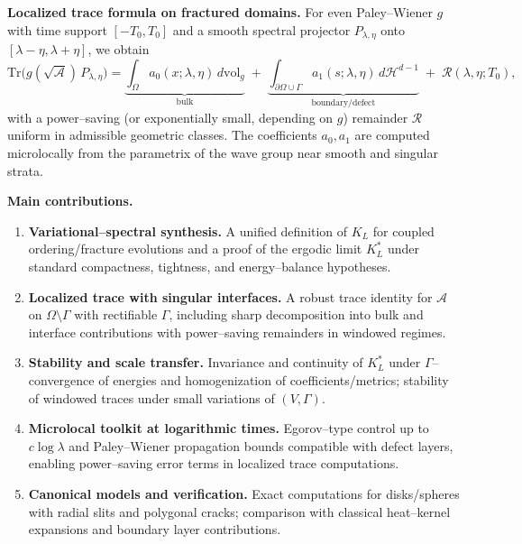 \medskip
\textbf{Localized trace formula on fractured domains.}
For even Paley–Wiener $g$ with time support $[-T_0,T_0]$ and a smooth spectral projector $P_{\lambda,\eta}$ onto $[\lambda-\eta,\lambda+\eta]$, we obtain
\[
\mathrm{Tr}\big(g(\sqrt{\mathcal{A}})\,P_{\lambda,\eta}\big)
=
\underbrace{\int_\Omega a_0(x;\lambda,\eta)\,d\mathrm{vol}_g}_{\text{bulk}}
\;+\;
\underbrace{\int_{\partial\Omega\cup\Gamma} a_1(s;\lambda,\eta)\,d\mathcal{H}^{d-1}}_{\text{boundary/defect}}
\;+\;
\mathcal{R}(\lambda,\eta;T_0),
\]
with a power–saving (or exponentially small, depending on $g$) remainder $\mathcal{R}$ uniform in admissible geometric classes. The coefficients $a_0,a_1$ are computed microlocally from the parametrix of the wave group near smooth and singular strata.

\medskip
\textbf{Main contributions.}
\begin{enumerate}[label=\textbf{C\arabic*.}, leftmargin=8mm]
  \item \textbf{Variational–spectral synthesis.} A unified definition of $K_L$ for coupled ordering/fracture evolutions and a proof of the ergodic limit $K_L^\ast$ under standard compactness, tightness, and energy–balance hypotheses.
  \item \textbf{Localized trace with singular interfaces.} A robust trace identity for $\mathcal{A}$ on $\Omega\setminus\Gamma$ with rectifiable $\Gamma$, including sharp decomposition into bulk and interface contributions with power–saving remainders in windowed regimes.
  \item \textbf{Stability and scale transfer.} Invariance and continuity of $K_L^\ast$ under $\Gamma$–convergence of energies and homogenization of coefficients/metrics; stability of windowed traces under small variations of $(V,\Gamma)$.
  \item \textbf{Microlocal toolkit at logarithmic times.} Egorov–type control up to $c\log\lambda$ and Paley–Wiener propagation bounds compatible with defect layers, enabling power–saving error terms in localized trace computations.
  \item \textbf{Canonical models and verification.} Exact computations for disks/spheres with radial slits and polygonal cracks; comparison with classical heat–kernel expansions and boundary layer contributions.
\end{enumerate}

